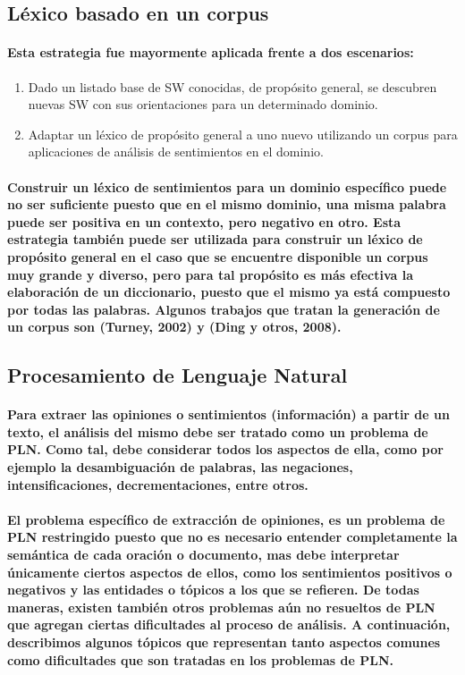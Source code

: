 \subsection{L\'exico basado en un corpus}
\paragraph{Esta estrategia fue mayormente aplicada frente a dos escenarios:}
\begin{enumerate}
\item Dado un listado base de SW conocidas, de prop\'osito general, se descubren nuevas SW con sus orientaciones para un determinado dominio.
\item Adaptar un l\'exico de prop\'osito general a uno nuevo utilizando un corpus para aplicaciones de an\'alisis de sentimientos en el dominio.
\end{enumerate}
\paragraph{Construir un l\'exico de sentimientos para un dominio espec\'ifico puede no ser suficiente puesto que en el mismo dominio, una misma palabra puede ser positiva en un contexto, pero negativo en otro. Esta estrategia tambi\'en puede ser utilizada para construir un l\'exico de prop\'osito general en el caso que se encuentre disponible un corpus muy grande y diverso, pero para tal prop\'osito es m\'as efectiva la elaboraci\'on de un diccionario, puesto que el mismo ya est\'a compuesto por todas las palabras. Algunos trabajos que tratan la generaci\'on de un corpus son (Turney, 2002) y (Ding y otros, 2008). }

\subsection{Procesamiento de Lenguaje Natural}
\paragraph{Para extraer las opiniones o sentimientos (informaci\'on) a partir de un texto, el an\'alisis del mismo debe ser tratado como un problema de PLN. Como tal, debe considerar todos los aspectos de ella, como por ejemplo la desambiguaci\'on de palabras, las negaciones, intensificaciones, decrementaciones, entre otros.}
\paragraph{El problema espec\'ifico de extracci\'on de opiniones, es un problema de PLN restringido puesto que no es necesario entender completamente la sem\'antica de cada oraci\'on o documento, mas debe interpretar \'unicamente ciertos aspectos de ellos, como los sentimientos positivos o negativos y las entidades o t\'opicos a los que se refieren. De todas maneras, existen tambi\'en otros problemas a\'un no resueltos de PLN que agregan ciertas dificultades al proceso de an\'alisis. A continuaci\'on, describimos algunos t\'opicos que representan tanto aspectos comunes como dificultades que son tratadas en los problemas de PLN.}

